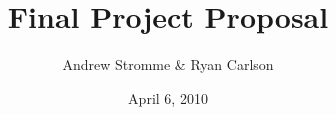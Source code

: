 \documentclass{article}
\begin{document}
\title{Final Project Proposal}
\author{Andrew Stromme \& Ryan Carlson}
\date{April 6, 2010}
\maketitle
\end{document}
